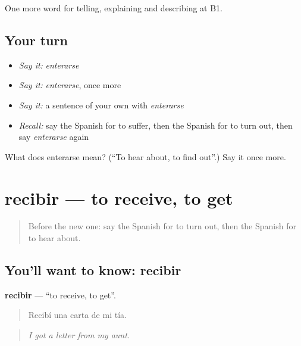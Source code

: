 \begin{grammarlens}[title={What you've built}]
One more word for telling, explaining and describing at B1.
\end{grammarlens}

\subsection*{Your turn}
\begin{itemize}
\raggedright
  \item \emph{Say it:} \emph{enterarse}
  \item \emph{Say it:} \emph{enterarse}, once more
  \item \emph{Say it:} a sentence of your own with \emph{enterarse}
  \item \emph{Recall:} say the Spanish for to suffer, then the Spanish for to turn out, then say \emph{enterarse} again
\end{itemize}

\begin{tcolorbox}[breakable,colback=teal!4,colframe=teal!35!black,title={Before you move on}]
What does enterarse mean? (\textquotedblleft{}To hear about, to find out\textquotedblright{}.) Say it once more.
\end{tcolorbox}
\section[recibir]{recibir — to receive, to get}

\label{lesson:ES-C574-recibir}



\begin{quote}
Before the new one: say the Spanish for to turn out, then the Spanish for to hear about.
\end{quote}

\subsection*{You'll want to know: recibir}
\textbf{recibir} — \textquotedblleft{}to receive, to get\textquotedblright{}.

\begin{quote}
Recibí una carta de mi tía.
\end{quote}

\begin{quote}
\emph{I got a letter from my aunt.}
\end{quote}

